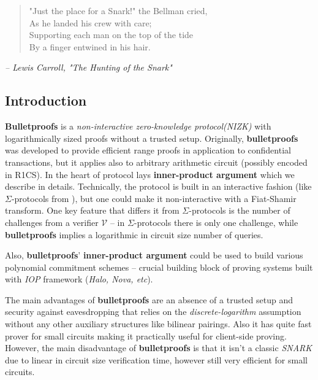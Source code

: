 \documentclass[../lecture-notes-148x210.tex]{subfiles}
\begin{document}
\begin{quote}
    \small "Just the place for a Snark!" the Bellman cried,\\
    As he landed his crew with care;\\
 Supporting each man on the top of the tide\\
    By a finger entwined in his hair.
\end{quote}
\begin{flushright}
\small \textit{-- Lewis Carroll, "The Hunting of the Snark"}
\end{flushright}

\subsection{Introduction}

\textbf{Bulletproofs} is a \textit{non-interactive zero-knowledge protocol(NIZK)} with logarithmically sized proofs without a trusted setup. Originally, \textbf{bulletproofs} was developed to provide efficient range proofs in application to confidential transactions, but it applies also to arbitrary arithmetic circuit (possibly encoded in R1CS). In the heart of protocol lays \textbf{inner-product argument} which we describe in details. Technically, the protocol is built in an interactive fashion (like $\Sigma$-protocols from ), but one could make it non-interactive with a Fiat-Shamir transform. One key feature that differs it from $\Sigma$-protocols is the number of challenges from a verifier $\mathcal{V}$ -- in $\Sigma$-protocols there is only one challenge, while \textbf{bulletproofs} implies a logarithmic in circuit size number of queries. 

Also, \textbf{bulletproofs}' \textbf{inner-product argument} could be used to build various polynomial commitment schemes -- crucial building block of proving systems built with \textit{IOP} framework (\textit{Halo, Nova, etc}).

The main advantages of \textbf{bulletproofs} are an absence of a trusted setup and security against eavesdropping that relies on the \textit{discrete-logarithm} assumption without any other auxiliary structures like bilinear pairings. Also it has quite fast prover for small circuits making it practically useful for client-side proving. However, the main disadvantage of \textbf{bulletproofs} is that it isn't a classic \textit{SNARK} due to linear in circuit size verification time, however still very efficient for small circuits.
\end{document}
